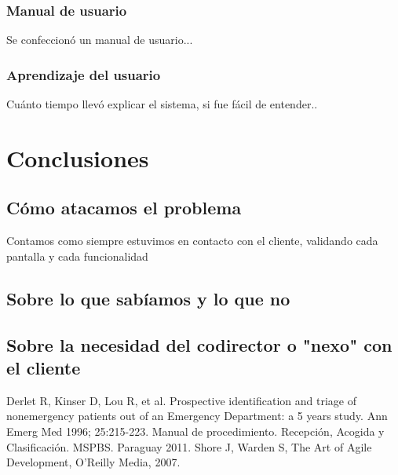 \documentclass[a4paper,10pt]{article}
\begin{document}
\subsubsection{Manual de usuario}
Se confeccionó un manual de usuario...
\subsubsection{Aprendizaje del usuario}
Cuánto tiempo llevó explicar el sistema, si fue fácil de entender..

\newpage 
\section{Conclusiones}
\subsection{Cómo atacamos el problema}
Contamos como siempre estuvimos en contacto con el cliente, validando cada pantalla y cada funcionalidad
\subsection{Sobre lo que sabíamos y lo que no}
\subsection{Sobre la necesidad del codirector o "nexo" con el cliente}




\newpage 

\begin{thebibliography}{3} 
\bibitem{} Derlet R, Kinser D, Lou R, et al. Prospective identification and triage of nonemergency patients out of an Emergency Department: a 5 years study. Ann Emerg Med 1996; 25:215-223.
\bibitem{} Manual de procedimiento. Recepción,  Acogida y Clasificación.  MSPBS. Paraguay 2011.
\bibitem{} Shore J, Warden S, The Art of Agile Development, O’Reilly Media, 2007.

\end{thebibliography}
 
\end{document}
